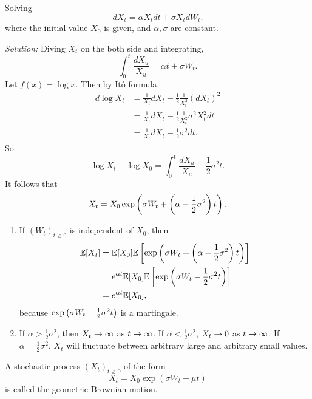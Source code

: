 \begin{exam}
    Solving
    \begin{equation*}
        dX_t = \alpha X_t dt + \sigma X_t dW_t.
    \end{equation*}
    where the initial value $X_0$ is given, and $\alpha,\sigma$ are constant.

    \noindent \emph{Solution:} Diving $X_t$ on the both side and integrating,
    \begin{equation*}
        \int_0^t \frac{dX_u}{X_u} = \alpha t + \sigma W_t.
    \end{equation*}
    Let $f(x) = \log x$. Then by It\^o formula,
    \begin{align*}
        d \log X_t &= \frac{1}{X_t}dX_t - \frac{1}{2} \frac{1}{X_t^2} (dX_t)^2 \\
        &= \frac{1}{X_t}dX_t - \frac{1}{2} \frac{1}{X_t^2} \sigma^2X_t^2 dt\\
        &= \frac{1}{X_t}dX_t - \frac{1}{2} \sigma^2 dt.
    \end{align*} 
    So
    \begin{equation*}
        \log X_t - \log X_0 = \int_0^t \frac{dX_u}{X_u} - \frac{1}{2} \sigma^2 t.
    \end{equation*}
    It follows that
    \begin{equation*}
        X_t = X_0\exp\left(\sigma W_t + \left(\alpha - \frac{1}{2}\sigma^2\right)t\right).
    \end{equation*}
    \begin{rmk}
        \begin{enumerate}[label=(\arabic{*})]
            \item If $(W_t)_{t \geq 0}$ is independent of $X_0$, then
            \begin{align*}
                \mathbb{E}[X_t] &= \mathbb{E}[X_0]\mathbb{E}\left[\exp\left(\sigma W_t + \left(\alpha - \frac{1}{2}\sigma^2\right)t\right)\right] \\
                &= e^{\alpha t}\mathbb{E}[X_0]\mathbb{E}\left[\exp\left(\sigma W_t - \frac{1}{2}\sigma^2t\right)\right] \\
                &=e^{\alpha t}\mathbb{E}[X_0],
            \end{align*}
            because $\exp\left(\sigma W_t - \frac{1}{2}\sigma^2t\right)$ is a martingale.

            \item If $\alpha > \frac{1}{2}\sigma^2$, then $X_t \rightarrow \infty$ as $t \rightarrow \infty$. If $\alpha < \frac{1}{2}\sigma^2$, $X_t \rightarrow 0$ as $t \rightarrow \infty$. If $\alpha = \frac{1}{2}\sigma^2$, $X_t$ will fluctuate between arbitrary large and arbitrary small values.
        \end{enumerate}
    \end{rmk}
    \begin{defn}
        A stochastic process $(X_t)_{t \geq 0}$ of the form
        \begin{equation*}
            X_t = X_0\exp(\sigma W_t + \mu t)
        \end{equation*}
        is called the geometric Brownian motion.
    \end{defn}
\end{exam}

